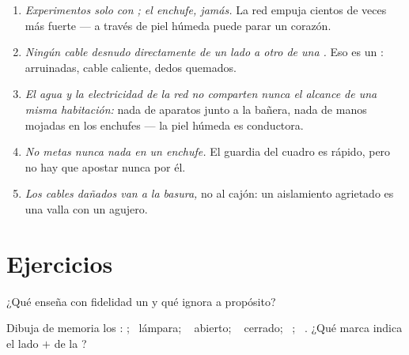 \begin{remark}\label{rem:g6:circuits-and-safety:rules}
\begin{enumerate}
  \item \emph{Experimentos solo con ; el enchufe, jamás.} La
        red empuja cientos de veces más fuerte --- a través de piel
        húmeda puede parar un corazón.
  \item \emph{Ningún cable desnudo directamente de un lado a otro de
        una .} Eso es un : 
        arruinadas, cable caliente, dedos quemados.
  \item \emph{El agua y la electricidad de la red no comparten nunca
        el alcance de una misma habitación:} nada de aparatos junto a
        la bañera, nada de manos mojadas en los enchufes --- la piel
        húmeda es conductora.
  \item \emph{No metas nunca nada en un enchufe.} El guardia del
        cuadro es rápido, pero no hay que apostar nunca por él.
  \item \emph{Los cables dañados van a la basura,} no al cajón: un
        aislamiento agrietado es una valla con un agujero.
\end{enumerate}
\end{remark}

\section{Ejercicios}

\begin{exercise}[$\star$]\label{exo:g6:circuits-and-safety:1}
¿Qué enseña con fidelidad un  y qué ignora a
propósito?
\end{exercise}

\begin{exercise}[$\star$]\label{exo:g6:circuits-and-safety:2}
Dibuja de memoria los : ; \ lámpara; \
 abierto; \  cerrado; \ ; \
. ¿Qué marca indica el lado $+$ de la ?
\end{exercise}

